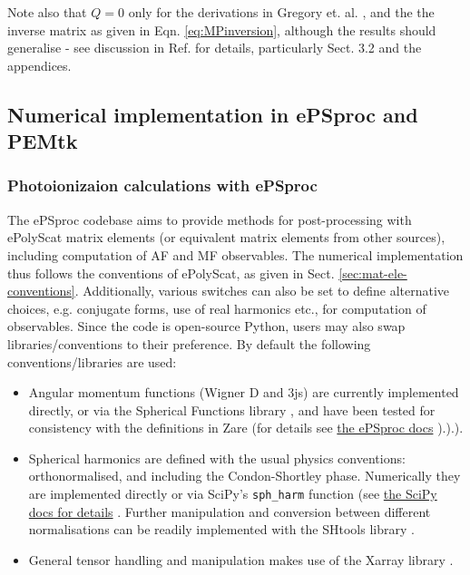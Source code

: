 \documentclass[10pt]{article}
\begin{document}
Note also that $Q=0$ only for the derivations in Gregory et. al. \cite{gregory2021MolecularFramePhotoelectron}, and the the inverse matrix as given in Eqn. \ref{eq:MPinversion}, although the results should generalise - see discussion in Ref. \cite{gregory2021MolecularFramePhotoelectron} for details, particularly Sect. 3.2 and the appendices.
\subsection{Numerical implementation in ePSproc and PEMtk\label{sec:numerical-notes}}

\subsubsection{Photoionizaion calculations with ePSproc}

The ePSproc codebase \cite{ePSprocAuthorea, ePSprocGithub, ePSprocDocs} aims to provide methods for post-processing with ePolyScat matrix elements (or equivalent matrix elements from other sources), including computation of AF and MF observables. The numerical implementation thus follows the conventions of ePolyScat, as given in Sect. \ref{sec:mat-ele-conventions}. Additionally, various switches can also be set to define alternative choices, e.g. conjugate forms, use of real harmonics etc., for computation of observables. Since the code is open-source Python, users may also swap libraries/conventions to their preference. By default the following conventions/libraries are used:

\begin{itemize}
\item Angular momentum functions (Wigner D and 3js) are currently implemented directly, or via the Spherical Functions library \cite{boyle2022SphericalFunctions}, and have been tested for consistency with the definitions in Zare (for details see \href{https://epsproc.readthedocs.io/en/latest/tests/Spherical_function_testing_Aug_2019.html}{the ePSproc docs} \cite{ePSprocDocs}).\cite{ePSprocDocs}).\cite{ePSprocDocs}).
\item Spherical harmonics are defined with the usual physics conventions: orthonormalised, and including the Condon-Shortley phase. Numerically they are implemented directly or via SciPy's \verb+sph_harm+ function (see \href{https://docs.scipy.org/doc/scipy/reference/generated/scipy.special.sph_harm.html}{the SciPy docs for details} \cite{SciPyDocumentation}. Further manipulation and conversion between different normalisations can be readily implemented with the SHtools library \cite{wieczorek2018SHToolsToolsWorking,SHtoolsGithub}.
\item General tensor handling and manipulation makes use of the Xarray library \cite{hoyer2017XarrayNDLabeled,XarrayDocumentation}.
\end{itemize}
\end{document}
